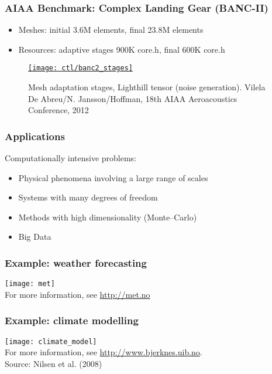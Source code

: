 \begin{frame}
  \frametitle{AIAA Benchmark: Complex Landing Gear (BANC-II)}

\begin{itemize}
\item Meshes: initial 3.6M elements, final 23.8M elements
\item Resources: adaptive stages 900K core.h, final 600K core.h
\end{itemize}
\begin{figure}[hbt]
  \centering
  \href{run:\figs/ctl/banc2.mp4}{\texttt{[image: ctl/banc2\_stages]}}
  \caption{Mesh adaptation stages, Lighthill tensor (noise generation). Vilela De Abreu/N. Jansson/Hoffman, 18th AIAA Aeroacoustics Conference, 2012}
\end{figure}

\end{frame}

\begin{frame}
  \frametitle{Applications}

Computationally intensive problems:
\begin{itemize}
\item Physical phenomena involving a large range of scales
\item Systems with many degrees of freedom
\item Methods with high dimensionality (Monte--Carlo)
\item Big Data 
\end{itemize}

\end{frame}

\begin{frame}
  \frametitle{Example: weather forecasting}
  \begin{center}
    \texttt{[image: met]} \\
    For more information, see \url{http://met.no}
  \end{center}
\end{frame}

\begin{frame}
  \frametitle{Example: climate modelling}

  \begin{center}
    \texttt{[image: climate\_model]} \\
    For more information, see \url{http://www.bjerknes.uib.no}. \\
    Source: Nilsen et al. (2008)
  \end{center}
\end{frame}

